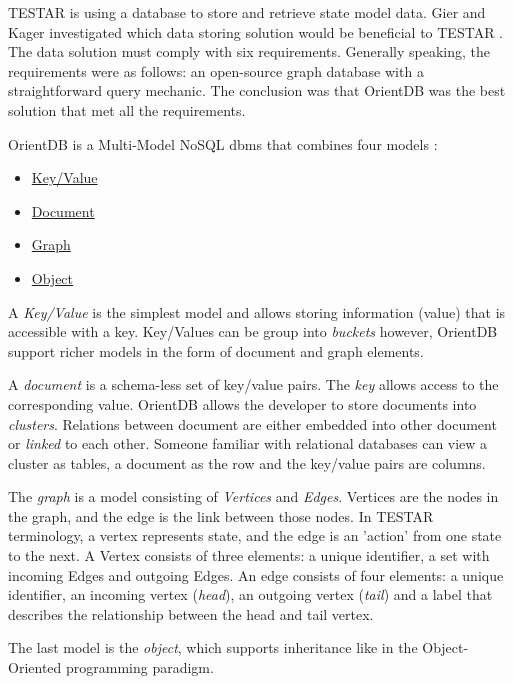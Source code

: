 TESTAR is using a database to store and retrieve state model data. Gier and Kager investigated which data storing solution would be beneficial to TESTAR \cite{GierKager}. The data solution must comply with six requirements. Generally speaking, the requirements were as follows: an open-source graph database with a straightforward query mechanic. The conclusion was that OrientDB was the best solution that met all the requirements.

OrientDB is a Multi-Model NoSQL \acrfull{dbms} that combines four models \cite{orientDbModeling}:

\begin{itemize}
    \item \hyperlink{db:key-value}{Key/Value}
    \item \hyperlink{db:document}{Document}
    \item \hyperlink{db:graph}{Graph}
    \item \hyperlink{db:object}{Object}
\end{itemize}

A \hypertarget{db:key-value}{\emph{Key/Value}} is the simplest model and allows storing information (value) that is accessible with a key. Key/Values can be group into \textit{buckets} however, OrientDB support richer models in the form of document and graph elements.

A \hypertarget{db:document}{\emph{document}} is a schema-less set of key/value pairs. The \emph{key} allows access to the corresponding value. OrientDB allows the developer to store documents into \emph{clusters}. Relations between document are either embedded into other document or \emph{linked} to each other. Someone familiar with relational databases can view a cluster as tables, a document as the row and the key/value pairs are columns.

The \hypertarget{db:graph}{\emph{graph}} is a model consisting of \emph{Vertices} and \emph{Edges}. Vertices are the nodes in the graph, and the edge is the link between those nodes. In TESTAR terminology, a vertex represents state, and the edge is an 'action' from one state to the next. A Vertex consists of three elements: a unique identifier, a set with incoming Edges and outgoing Edges. An edge consists of four elements: a unique identifier, an incoming vertex (\emph{head}), an outgoing vertex (\emph{tail}) and a label that describes the relationship between the head and tail vertex.\par

The last model is the \hypertarget{db:object}{\emph{object}}, which supports inheritance like in the Object-Oriented programming paradigm.\par

